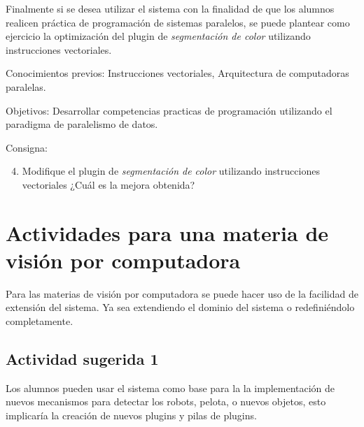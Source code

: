 Finalmente si se desea utilizar el sistema con la finalidad de que los alumnos
realicen práctica de programación de sistemas paralelos, se puede plantear como
ejercicio la optimización del plugin de \emph{segmentación de color} utilizando
instrucciones vectoriales.

\begin{description}

	\item{Conocimientos previos}: Instrucciones vectoriales, Arquitectura de
		computadoras paralelas.

	\item{Objetivos}: Desarrollar competencias practicas de programación
		utilizando el paradigma de paralelismo de datos.

	\item{Consigna}: \begin{enumerate}

	\setcounter{enumi}{3}

	\item{Modifique el plugin de \emph{segmentación de color} utilizando
	instrucciones vectoriales ¿Cuál es la mejora obtenida?}

\end{enumerate}

\end{description}

\section{Actividades para una materia de visión por computadora}

\label{eduvision}

Para las materias de visión por computadora se puede hacer uso de la facilidad
de extensión del sistema. Ya sea extendiendo el dominio del sistema o
redefiniéndolo completamente.

\subsection{Actividad sugerida 1}

Los alumnos pueden usar el sistema como base para la la implementación de nuevos
mecanismos para detectar los robots, pelota, o nuevos objetos, esto implicaría
la creación de nuevos plugins y pilas de plugins.

